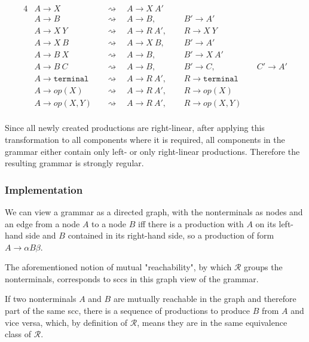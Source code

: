 \noindent
\begin{alignat*}{4}
	& A \rightarrow X 	 && \rightsquigarrow \quad A \rightarrow X\ A'\ \  & &\\
	& A \rightarrow B 	 && \rightsquigarrow \quad A \rightarrow B,\ \ 	   & &B' \rightarrow A'\ &&\\
	& A \rightarrow X\ Y && \rightsquigarrow \quad A \rightarrow R\ A',\ \ & &R  \rightarrow X\ Y\ &&\\
	& A \rightarrow X\ B && \rightsquigarrow \quad A \rightarrow X\ B,\ \  & &B' \rightarrow A'\ &&\\
	& A \rightarrow B\ X && \rightsquigarrow \quad A \rightarrow B,\ \ 	   & &B' \rightarrow X\ A'\ &&\\
	& A \rightarrow B\ C && \rightsquigarrow \quad A \rightarrow B,\ \     & &B' \rightarrow C,\ &&C' \rightarrow A'\\
	& A \rightarrow \texttt{terminal} && \rightsquigarrow \quad A \rightarrow R\ A',\ \ & &R \rightarrow \texttt{terminal}\ &&\\
	& A \rightarrow op(X) && \rightsquigarrow  \quad A \rightarrow R\ A',\ \ & &R \rightarrow op(X)\ &&\\
	& A \rightarrow op(X,Y) && \rightsquigarrow  \quad A \rightarrow R\ A',\ \ & &R \rightarrow op(X,Y)\ &&\\
\end{alignat*}

Since all newly created productions are right-linear, after applying this transformation to all components where it is required, all components in the grammar either contain only left- or only right-linear productions. Therefore the resulting grammar is strongly regular.

\subsubsection{Implementation}

We can view a grammar as a directed graph, with the nonterminals as nodes and an edge from a node $A$ to a node $B$ iff there is a production with $A$ on its left-hand side and $B$ contained in its right-hand side, so a production of form $A \rightarrow \alpha B \beta$.

The aforementioned notion of mutual "reachability", by which $\mathcal{R}$ groups the nonterminals, corresponds to \acp{scc} in this graph view of the grammar.

If two nonterminals $A$ and $B$ are mutually reachable in the graph and therefore part of the same \ac{scc}, there is a sequence of productions to produce $B$ from $A$ and vice versa, which, by definition of $\mathcal{R}$, means they are in the same equivalence class of $\mathcal{R}$.

